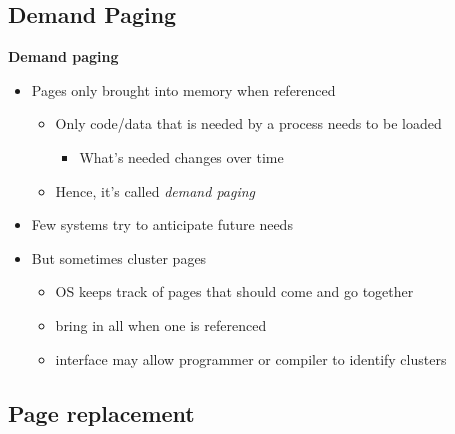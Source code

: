 \documentclass[11pt,a4paper]{article}
\begin{document}
\subsection{Demand Paging}

\textbf{Demand paging}
\begin{itemize}
    \item Pages only brought into memory when referenced
        \begin{itemize}
            \item Only code/data that is needed by a process needs to be loaded
                \begin{itemize}
                    \item What's needed changes over time
                \end{itemize}
            \item Hence, it's called \emph{demand paging}
        \end{itemize}
    \item Few systems try to anticipate future needs
    \item But sometimes cluster pages
        \begin{itemize}
            \item OS keeps track of pages that should come and go together
            \item bring in all when one is referenced
            \item interface may allow programmer or compiler to identify clusters
        \end{itemize}
\end{itemize}

\subsection{Page replacement}
\end{document}
